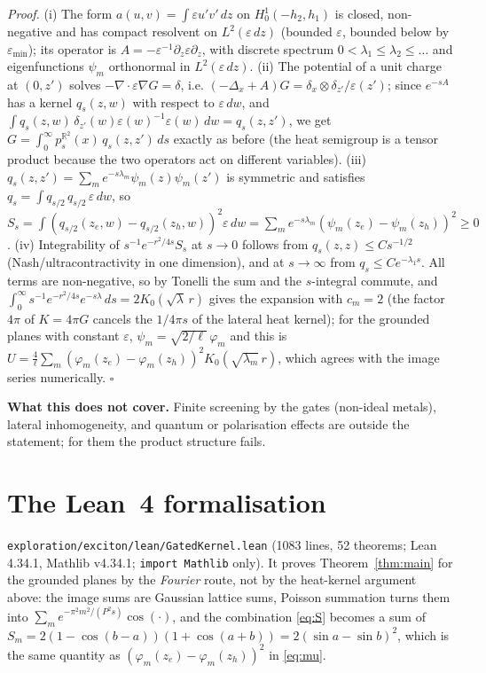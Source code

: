 \documentclass[11pt,a4paper]{article}
\theoremstyle{remark}
\newcommand{\R}{\mathbb{R}}
\begin{document}
\emph{Proof.} (i) The form $a(u,v)=\int\varepsilon u'v'\,dz$ on $H^1_0(-h_2,h_1)$ is closed, non-negative and has compact resolvent on
$L^2(\varepsilon\,dz)$ (bounded $\varepsilon$, bounded below by $\varepsilon_{\min}$); its operator is $A=-\varepsilon^{-1}\partial_z\varepsilon\partial_z$, with discrete spectrum
$0<\lambda_1\le\lambda_2\le\dots$ and eigenfunctions $\psi_m$ orthonormal in $L^2(\varepsilon\,dz)$. (ii) The potential of a unit charge at $(0,z')$ solves $-\nabla\!\cdot\varepsilon\nabla G=\delta$,
i.e. $(-\Delta_x+A)G=\delta_x\otimes\delta_{z'}/\varepsilon(z')$; since $e^{-sA}$ has a kernel $q_s(z,w)$ with respect to $\varepsilon\,dw$, and
$\int q_s(z,w)\,\delta_{z'}(w)\varepsilon(w)^{-1}\varepsilon(w)\,dw=q_s(z,z')$, we get $G=\int_0^\infty p^{\R^2}_s(x)\,q_s(z,z')\,ds$ exactly as before (the
heat semigroup is a tensor product because the two operators act on different variables). (iii) $q_s(z,z')=\sum_me^{-s\lambda_m}\psi_m(z)\psi_m(z')$ is symmetric
and satisfies $q_s=\int q_{s/2}\,q_{s/2}\,\varepsilon\,dw$, so $S_s=\int(q_{s/2}(z_e,w)-q_{s/2}(z_h,w))^2\varepsilon\,dw=\sum_me^{-s\lambda_m}(\psi_m(z_e)-\psi_m(z_h))^2\ge0$.
(iv) Integrability of $s^{-1}e^{-r^2/4s}S_s$ at $s\to0$ follows from $q_s(z,z)\le Cs^{-1/2}$ (Nash/ultracontractivity in one dimension),
and at $s\to\infty$ from $q_s\le Ce^{-\lambda_1s}$. All terms are non-negative, so by Tonelli the sum and the $s$-integral commute, and
$\int_0^\infty s^{-1}e^{-r^2/4s}e^{-s\lambda}\,ds=2K_0(\sqrt\lambda\,r)$ gives the expansion with $c_m=2$ (the factor $4\pi$ of $K=4\pi G$ cancels the $1/4\pi s$ of the lateral heat kernel); for the grounded
planes with constant $\varepsilon$, $\psi_m=\sqrt{2/\ell}\,\varphi_m$ and this is $U=\frac4\ell\sum_m(\varphi_m(z_e)-\varphi_m(z_h))^2K_0(\sqrt{\lambda_m}\,r)$, which agrees with the image series numerically. \hfill$\square$

\textbf{What this does not cover.} Finite screening by the gates (non-ideal metals), lateral inhomogeneity, and quantum or
polarisation effects are outside the statement; for them the product structure fails.

\section{The Lean~4 formalisation}

\texttt{exploration/exciton/lean/GatedKernel.lean} (1083 lines, 52 theorems; Lean 4.34.1, Mathlib v4.34.1; \texttt{import Mathlib}
only). It proves Theorem~\ref{thm:main} for the grounded planes by the \emph{Fourier} route, not by the heat-kernel argument above:
the image sums are Gaussian lattice sums, Poisson summation turns them into $\sum_me^{-\pi^2m^2/(P^2s)}\cos(\cdot)$, and the combination
\eqref{eq:S} becomes a sum of $S_m=2(1-\cos(b-a))(1+\cos(a+b))=2(\sin a-\sin b)^2$, which is the same quantity as
$(\varphi_m(z_e)-\varphi_m(z_h))^2$ in \eqref{eq:mu}.
\end{document}
